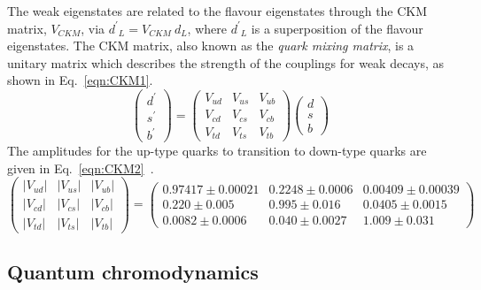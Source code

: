 The weak eigenstates are related to the flavour eigenstates through the CKM matrix, $V_{CKM}$, via ${d^{\prime}}_L = V_{CKM}~d_L$, where ${d^{\prime}}_L$ is a superposition of the flavour eigenstates. The CKM matrix, also known as the \emph{quark mixing matrix}, is a unitary matrix which describes the strength of the couplings for weak decays, as shown in Eq.~\ref{eqn:CKM1}. 
\begin{equation}
\label{eqn:CKM1}
{\begin{pmatrix}
d^{\prime }\\
s^{\prime }\\
b^{\prime }
\end{pmatrix}}
=
{\begin{pmatrix}
V_{ud}&V_{us}&V_{ub}\\
V_{cd}&V_{cs}&V_{cb}\\
V_{td}&V_{ts}&V_{tb}
\end{pmatrix}}
{\begin{pmatrix}d\\s\\b
\end{pmatrix}}
\end{equation}
The amplitudes for the up-type quarks to transition to down-type quarks are given in Eq.~\ref{eqn:CKM2}~\cite{PDG2016}.
\begin{equation}
\label{eqn:CKM2}
{\begin{pmatrix}
|V_{ud}|&|V_{us}|&|V_{ub}|\\|V_{cd}|&|V_{cs}|&|V_{cb}|\\|V_{td}|&|V_{ts}|&|V_{tb}|
\end{pmatrix}}
=
{\begin{pmatrix}0.97417\pm 0.00021 & 0.2248\pm 0.0006 & 0.00409\pm{0.00039}\\
0.220\pm 0.005 & 0.995\pm 0.016 & 0.0405\pm{0.0015}\\
0.0082\pm{0.0006} & 0.040\pm{0.0027}&1.009\pm0.031
\end{pmatrix}}
\end{equation}





\subsection{Quantum chromodynamics}

